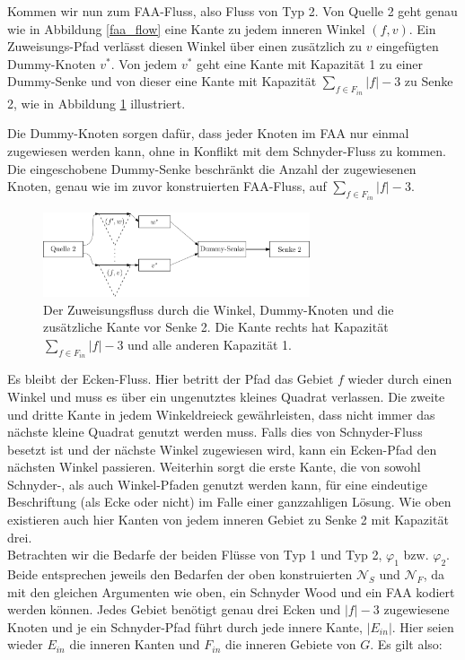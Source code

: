 Kommen wir nun zum FAA-Fluss, also Fluss von Typ 2. Von Quelle 2 geht genau wie in Abbildung \ref{faa_flow} eine Kante zu jedem inneren Winkel $(f,v)$. Ein Zuweisungs-Pfad verlässt diesen Winkel über einen zusätzlich zu $v$ eingefügten Dummy-Knoten $v^*$. Von jedem $v^*$ geht eine Kante mit Kapazität 1 zu einer Dummy-Senke und von dieser eine Kante mit Kapazität $\sum_{f \in F_{in}} |f|-3$ zu Senke 2, wie in Abbildung \ref{dummy_sink} illustriert.

Die Dummy-Knoten sorgen dafür, dass jeder Knoten im FAA nur einmal zugewiesen werden kann, ohne in Konflikt mit dem Schnyder-Fluss zu kommen. Die eingeschobene Dummy-Senke beschränkt die Anzahl der zugewiesenen Knoten, genau wie im zuvor konstruierten FAA-Fluss, auf $\sum_{f \in F_{in}} |f|-3$.

\begin{figure}[h]
	\centering
  	\includegraphics[width=0.7\textwidth]{dummy_sink.png}
  	\caption{Der Zuweisungsfluss durch die Winkel, Dummy-Knoten und die zusätzliche Kante vor Senke 2. Die Kante rechts hat Kapazität $\sum_{f \in F_{in}} |f|-3$ und alle anderen Kapazität 1.}
	\label{dummy_sink}
\end{figure}

Es bleibt der Ecken-Fluss. Hier betritt der Pfad das Gebiet $f$ wieder durch einen Winkel und muss es über ein ungenutztes kleines Quadrat verlassen. Die zweite und dritte Kante in jedem Winkeldreieck gewährleisten, dass nicht immer das nächste kleine Quadrat genutzt werden muss. Falls dies von Schnyder-Fluss besetzt ist und der nächste Winkel zugewiesen wird, kann ein Ecken-Pfad den nächsten Winkel passieren. Weiterhin sorgt die erste Kante, die von sowohl Schnyder-, als auch Winkel-Pfaden genutzt werden kann, für eine eindeutige Beschriftung (als Ecke oder nicht) im Falle einer ganzzahligen Lösung. Wie oben existieren auch hier Kanten von jedem inneren Gebiet zu Senke 2 mit Kapazität drei.\\

Betrachten wir die Bedarfe der beiden Flüsse von Typ 1 und Typ 2, $\varphi_1$ bzw. $\varphi_2$. Beide entsprechen jeweils den Bedarfen der oben konstruierten $\mathcal{N}_S$ und $\mathcal{N}_F$, da mit den gleichen Argumenten wie oben, ein Schnyder Wood und ein FAA kodiert werden können. Jedes Gebiet benötigt genau drei Ecken und $|f|-3$ zugewiesene Knoten und je ein Schnyder-Pfad führt durch jede innere Kante, $|E_{in}|$. Hier seien wieder $E_{in}$ die inneren Kanten und $F_{in}$ die inneren Gebiete von $G$. Es gilt also:


